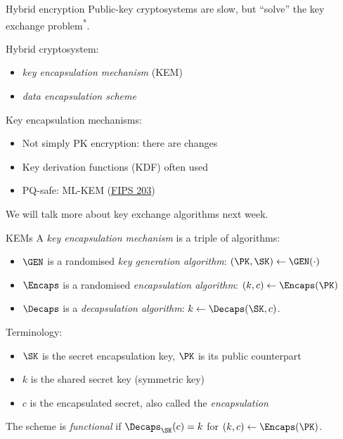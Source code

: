 \begin{frame}{Hybrid encryption}
  Public-key cryptosystems are slow, but \enquote{solve} the key exchange problem\textsuperscript{*}.

  \pause
  Hybrid cryptosystem:
  \begin{itemize}
    \item \emph{key encapsulation mechanism} (KEM)
    \item \emph{data encapsulation scheme}
  \end{itemize}

  \pause
  Key encapsulation mechanisms:
  \begin{itemize}[<+(1)->]
    \item Not simply PK encryption: there are changes
    \item Key derivation functions (KDF) often used
    \item PQ-safe: ML-KEM (\href{https://csrc.nist.gov/pubs/fips/203/final}{FIPS 203})
  \end{itemize}

  \pause
  We will talk more about key exchange algorithms next week.
\end{frame}

\begin{frame}{KEMs}
  A \emph{key encapsulation mechanism} is a triple of algorithms:
  \begin{itemize}[<+(1)->]
    \item $\GEN$ is a randomised \emph{key generation algorithm}: $(\PK,\SK)\gets\GEN(\cdot)$
    \item $\Encaps$ is a randomised \emph{encapsulation algorithm}: $(k, c)\gets\Encaps(\PK)$
    \item $\Decaps$ is a \emph{decapsulation algorithm}: $k\gets\Decaps(\SK, c)$.
  \end{itemize}

  \pause
  Terminology:
  \begin{itemize}[<+(1)->]
    \item $\SK$ is the secret encapsulation key, $\PK$ is its public counterpart
    \item $k$ is the shared secret key (symmetric key)
    \item $c$ is the encapsulated secret, also called the \emph{encapsulation}
  \end{itemize}

  \pause
  The scheme is \emph{functional} if $\Decaps_\SK(c) = k$ for $(k,c) \gets \Encaps(\PK)$.
\end{frame}

